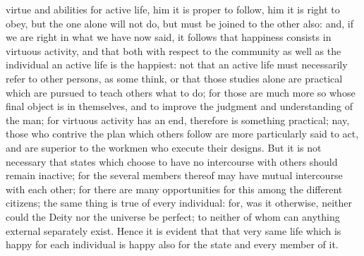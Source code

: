 virtue and abilities for active life, him it is proper to follow, him it
is right to obey, but the one alone will not do, but must be joined to the
other also: and, if we are right in what we have now said, it follows that
happiness consists in virtuous activity, and that both with respect to the
community as well as the individual an active life is the happiest: not
that an active life must necessarily refer to other persons, as some
think, or that those studies alone are practical which are pursued to
teach others what to do; for those are much more so whose final object is
in themselves, and to improve the judgment and understanding of the man;
for virtuous activity has an end, therefore is something practical; nay,
those who contrive the plan which others follow are more particularly said
to act, and are superior to the workmen who execute their designs. But it
is not necessary that states which choose to have no intercourse with
others should remain inactive; for the several members thereof may have
mutual intercourse with each other; for there are many opportunities for
this among the different citizens; the same thing is true of every
individual: for, was it otherwise, neither could the Deity nor the
universe be perfect; to neither of whom can anything external separately
exist. Hence it is evident that that very same life which is happy for
each individual is happy also for the state and every member of it.


